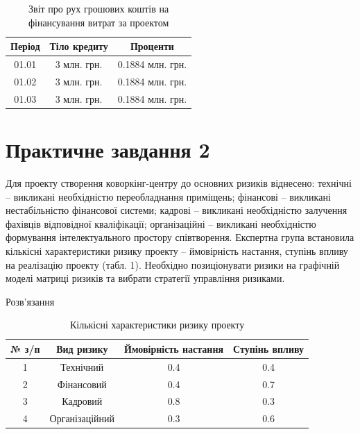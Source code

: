 \documentclass[oneside,14pt]{extarticle}
\begin{document}
\begin{table}[h]
	\centering
	\caption{Звіт про рух грошових коштів на фінансування витрат за проектом}
	\renewcommand{\arraystretch}{1.3}
	\begin{tabular}{|c|c|c|}
		\hline
		\textbf{Період} & \textbf{Тіло кредиту} & \textbf{Проценти} \\
		\hline
		01.01 & 3 млн. грн. & 0.1884 млн. грн. \\
		\hline
		01.02 & 3 млн. грн. & 0.1884 млн. грн. \\
		\hline
		01.03 & 3 млн. грн. & 0.1884 млн. грн. \\
		\hline
	\end{tabular}
\end{table}


\newpage
\section*{Практичне завдання 2}

Для проекту створення коворкінг-центру до основних ризиків віднесено: технічні – викликані необхідністю переобладнання приміщень; фінансові – викликані нестабільністю фінансової системи; кадрові – викликані необхідністю залучення фахівців відповідної кваліфікації; організаційні – викликані необхідністю формування інтелектуального простору співтворення. Експертна група встановила кількісні характеристики ризику проекту – ймовірність настання, ступінь впливу на реалізацію проекту (табл. 1). Необхідно позиціонувати ризики на графічній моделі матриці ризиків та вибрати стратегії управління ризиками.

Розв'язання

\begin{table}[h]
	\centering
	\renewcommand{\arraystretch}{1.3}
	\caption{Кількісні характеристики ризику проекту}
	\begin{tabular}{|c|c|c|c|}
		\hline
		\textbf{№ з/п} & \textbf{Вид ризику} & \textbf{Ймовірність настання} & \textbf{Ступінь впливу} \\
		\hline
		1 & Технічний & 0.4 & 0.4 \\
		\hline
		2 & Фінансовий & 0.4 & 0.7 \\
		\hline
		3 & Кадровий & 0.8 & 0.3 \\
		\hline
		4 & Організаційний & 0.3 & 0.6 \\
		\hline
	\end{tabular}
\end{table}
\end{document}
